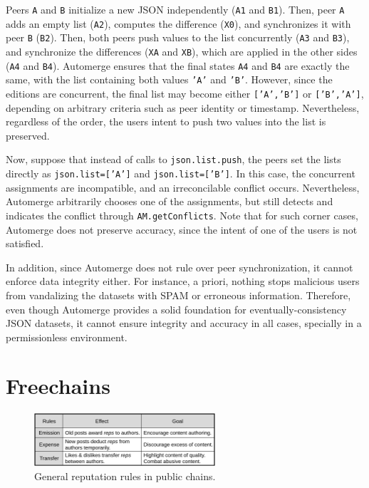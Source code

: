 \documentclass[12pt]{article}
\newcommand{\code}[1]  {\texttt{\footnotesize{#1}}}
\begin{document}
Peers \code{A} and \code{B} initialize a new JSON independently (\code{A1} and
\code{B1}).
Then, peer \code{A} adds an empty list (\code{A2}), computes the difference
(\code{X0}), and synchronizes it with peer \code{B} (\code{B2}).
Then, both peers push values to the list concurrently (\code{A3} and
\code{B3}), and synchronize the differences (\code{XA} and \code{XB}), which
are applied in the other sides (\code{A4} and \code{B4}).
Automerge ensures that the final states \code{A4} and \code{B4} are exactly the
same, with the list containing both values \code{'A'} and \code{'B'}.
However, since the editions are concurrent, the final list may become either
\code{['A','B']} or \code{['B','A']}, depending on arbitrary criteria such as
peer identity or timestamp.
Nevertheless, regardless of the order, the users intent to push two values into
the list is preserved.

Now, suppose that instead of calls to \code{json.list.push}, the peers set the
lists directly as \code{json.list=['A']} and \code{json.list=['B']}.
In this case, the concurrent assignments are incompatible, and an
irreconcilable conflict occurs.
Nevertheless, Automerge arbitrarily chooses one of the assignments, but still
detects and indicates the conflict through \code{AM.getConflicts}.
Note that for such corner cases, Automerge does not preserve accuracy, since
the intent of one of the users is not satisfied.

In addition, since Automerge does not rule over peer synchronization, it cannot
enforce data integrity either.
For instance, a priori, nothing stops malicious users from vandalizing the
datasets with SPAM or erroneous information.
%
Therefore, even though Automerge provides a solid foundation for
eventually-consistency JSON datasets, it cannot ensure integrity and accuracy
in all cases, specially in a permissionless environment.

\section{Freechains}
\label{sec.freechains}

\begin{figure}
    \includegraphics[width=0.6\textwidth]{general.png}
    \caption{General reputation rules in public chains.}
    \label{fig.general}
\end{figure}
\end{document}
